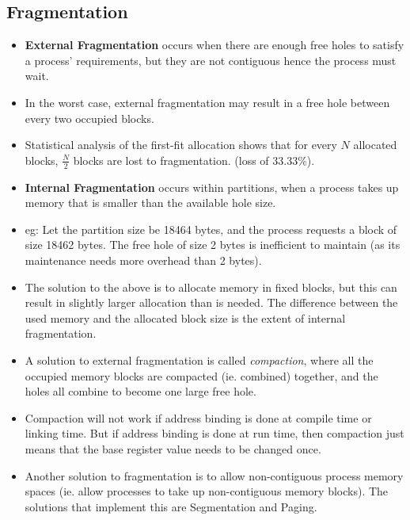\documentclass{article}
\theoremstyle{plain}
\theoremstyle{definition}
\begin{document}
\subsection{Fragmentation}
\begin{itemize}
    \item \textbf{External Fragmentation} occurs when there are enough free holes to satisfy a process' requirements, but they are not contiguous hence the process must wait. 
    
    \item In the worst case, external fragmentation may result in a free hole between every two occupied blocks.
    
    \item Statistical analysis of the first-fit allocation shows that for every $N$ allocated blocks, $\frac{N}{2}$ blocks are lost to fragmentation. (loss of 33.33\%). 
    
    \item \textbf{Internal Fragmentation} occurs within partitions, when a process takes up memory that is smaller than the available hole size.
    
    \item eg: Let the partition size be 18464 bytes, and the process requests a block of size 18462 bytes. The free hole of size 2 bytes is inefficient to maintain (as its maintenance needs more overhead than 2 bytes). 
    
    \item The solution to the above is to allocate memory in fixed blocks, but this can result in slightly larger allocation than is needed. The difference between the used memory and the allocated block size is the extent of internal fragmentation.
    
    \item A solution to external fragmentation is called \textit{compaction}, where all the occupied memory blocks are compacted (ie. combined) together, and the holes all combine to become one large free hole. 
    
    \item Compaction will not work if address binding is done at compile time or linking time. But if address binding is done at run time, then compaction just means that the base register value needs to be changed once. 
    
    \item Another solution to fragmentation is to allow non-contiguous process memory spaces (ie. allow processes to take up non-contiguous memory blocks). The solutions that implement this are Segmentation and Paging.
\end{itemize}
\end{document}
